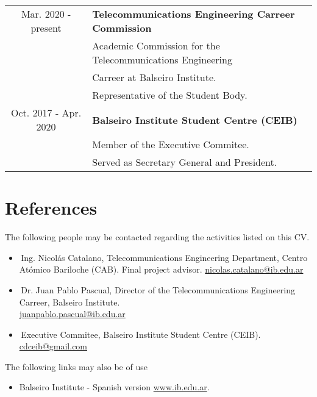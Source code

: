 \documentclass[10pt]{article}
\newcommand{\tab}{\hspace{\parindent}}
\begin{document}
\begin{tabular}{cl}

Mar. 2020 - present 	& \textbf{Telecommunications Engineering Carreer Commission} \\
						& \tab Academic Commission for the Telecommunications Engineering \\ & \tab \tab Carreer at Balseiro Institute\footnotemark[2]. \\
						& \tab Representative of the Student Body.\\		

Oct. 2017 - Apr. 2020 	& \textbf{Balseiro Institute Student Centre (CEIB)} \\
						& \tab Member of the Executive Commitee\footnotemark[3].\\
						& \tab Served as Secretary General and President.
\end{tabular}


\section*{References}

The following people may be contacted regarding the activities listed on this CV.

\begin{itemize}
	\item[] \footnotemark[1]\,Ing. Nicolás Catalano, Telecommunications Engineering Department, Centro Atómico Bariloche (CAB). Final project advisor. \url{nicolas.catalano@ib.edu.ar}
	\item[] \footnotemark[2]\,Dr. Juan Pablo Pascual, Director of the Telecommunications Engineering Carreer, Balseiro Institute.\\\url{juanpablo.pascual@ib.edu.ar}  
	\item[] \footnotemark[3]\,Executive Commitee, Balseiro Institute Student Centre (CEIB). \url{cdceib@gmail.com} 
\end{itemize}

\noindent The following links may also be of use
\begin{itemize}
	\item[] Balseiro Institute - Spanish version \url{www.ib.edu.ar}.
\end{itemize} 
\end{document}
